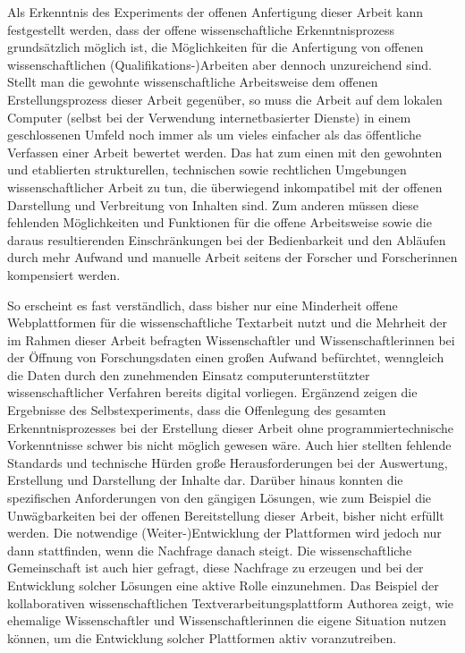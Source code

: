 Als Erkenntnis des Experiments der offenen Anfertigung dieser Arbeit kann festgestellt werden, dass der offene wissenschaftliche Erkenntnisprozess grundsätzlich möglich ist, die Möglichkeiten für die Anfertigung von offenen wissenschaftlichen (Qualifikations-)Arbeiten aber dennoch unzureichend sind. Stellt man die gewohnte wissenschaftliche Arbeitsweise dem offenen Erstellungsprozess dieser Arbeit gegenüber, so muss die Arbeit auf dem lokalen Computer (selbst bei der Verwendung internetbasierter Dienste) in einem geschlossenen Umfeld noch immer als um vieles einfacher als das öffentliche Verfassen einer Arbeit bewertet werden. Das hat zum einen mit den gewohnten und etablierten strukturellen, technischen sowie rechtlichen Umgebungen wissenschaftlicher Arbeit zu tun, die überwiegend inkompatibel mit der offenen Darstellung und Verbreitung von Inhalten sind. Zum anderen müssen diese fehlenden Möglichkeiten und Funktionen für die offene Arbeitsweise sowie die daraus resultierenden Einschränkungen bei der Bedienbarkeit und den Abläufen durch mehr Aufwand und manuelle Arbeit seitens der Forscher und Forscherinnen kompensiert werden.

So erscheint es fast verständlich, dass bisher nur eine Minderheit offene Webplattformen für die wissenschaftliche Textarbeit \cite{Perkel_2014} nutzt und die Mehrheit der im Rahmen dieser Arbeit befragten Wissenschaftler und Wissenschaftlerinnen bei der Öffnung von Forschungsdaten einen großen Aufwand befürchtet, wenngleich die Daten durch den zunehmenden Einsatz computerunterstützter wissenschaftlicher Verfahren bereits digital vorliegen. Ergänzend zeigen die Ergebnisse des Selbstexperiments, dass die Offenlegung des gesamten Erkenntnisprozesses bei der Erstellung dieser Arbeit ohne programmiertechnische Vorkenntnisse schwer bis nicht möglich gewesen wäre. Auch hier stellten fehlende Standards und technische Hürden große Herausforderungen bei der Auswertung, Erstellung und Darstellung der Inhalte dar. Darüber hinaus konnten die spezifischen Anforderungen von den gängigen Lösungen, wie zum Beispiel die Unwägbarkeiten bei der offenen Bereitstellung dieser Arbeit, bisher nicht erfüllt werden. Die notwendige (Weiter-)Entwicklung der Plattformen wird jedoch nur dann stattfinden, wenn die Nachfrage danach steigt. Die wissenschaftliche Gemeinschaft ist auch hier gefragt, diese Nachfrage zu erzeugen und bei der Entwicklung solcher Lösungen eine aktive Rolle einzunehmen. Das Beispiel der kollaborativen wissenschaftlichen Textverarbeitungsplattform Authorea zeigt, wie ehemalige Wissenschaftler und Wissenschaftlerinnen die eigene Situation nutzen können, um die Entwicklung solcher Plattformen aktiv voranzutreiben.

